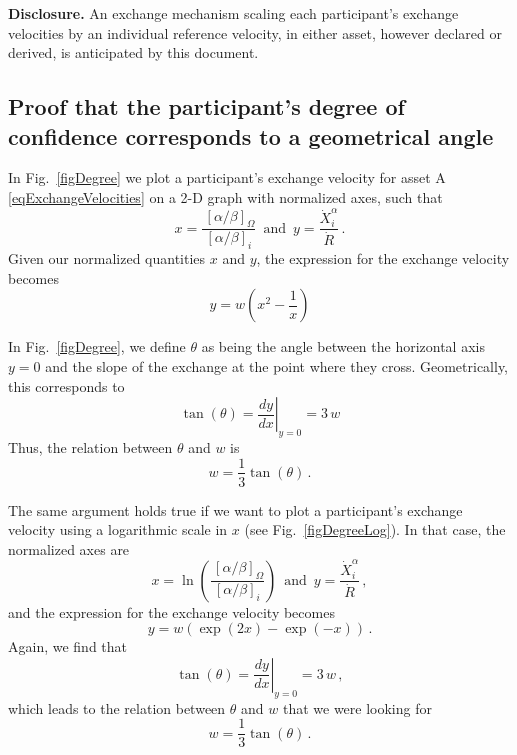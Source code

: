 \documentclass[letterpaper]{article}
\newcommand{\priceAB}{\left[\alpha / \beta\right]}
\begin{document}
\textbf{Disclosure.} An exchange mechanism scaling each participant's exchange velocities
by an individual reference velocity, in either asset, however declared or derived, is
anticipated by this document.

\subsection{Proof that the participant's degree of confidence corresponds to a geometrical angle}\label{secProofDegree}

In Fig.~\ref{figDegree} we plot a participant's exchange velocity for asset A \eqref{eqExchangeVelocities} on a 2-D graph with normalized axes, such that
\begin{equation*}
    x = \frac{\hspace{2pt}\priceAB_\Omega}{\priceAB_i}\,\text{ and }\,
    y = \frac{\dot{X}_i^\alpha}{\dot{R}} \,.
\end{equation*}
Given our normalized quantities $x$ and $y$, the expression for the exchange velocity becomes
\begin{equation*}
    y = w \left(x^2 - \frac{1}{x}\right)
\end{equation*}

In Fig.~\ref{figDegree}, we define $\theta$ as being the angle between the horizontal axis $y=0$ and the slope of the exchange at the point where they cross. Geometrically, this corresponds to
\begin{equation*}
    \tan \left( \theta \right) = \left.\frac{dy}{dx}\right|_{y=0} = 3\, w
\end{equation*}
Thus, the relation between $\theta$ and $w$ is
\begin{equation*}
    w = \frac{1}{3}\tan \left(\theta\right)\,.
\end{equation*}

The same argument holds true if we want to plot a participant's exchange velocity using a logarithmic scale in $x$ (see Fig.~\ref{figDegreeLog}). In that case, the normalized axes are
\begin{equation*}
    x = \ln\!\left(\frac{\hspace{2pt}\priceAB_\Omega}{\priceAB_i}\right) \,\text{ and }\,
    y = \frac{\dot{X}_i^\alpha}{\dot{R}}\,,
\end{equation*}
and the expression for the exchange velocity becomes
\begin{equation*}
    y = w \left(\exp(2x) - \exp(-x)\right) \, .
\end{equation*}
Again, we find that
\begin{equation*}
    \tan \left( \theta \right) = \left.\frac{dy}{dx}\right|_{y=0} = 3\, w \,,
\end{equation*}
which leads to the relation between $\theta$ and $w$ that we were looking for
\begin{equation*}
    w = \frac{1}{3}\tan \left(\theta\right)\,.
\end{equation*}
\end{document}
